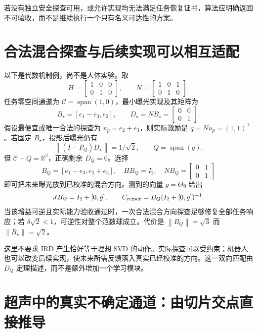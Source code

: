 \documentclass[11pt,a4paper]{article}
\numberwithin{equation}{section}
\theoremstyle{definition}
\newcommand{\R}{\mathbb R}
\newcommand{\norm}[1]{\left\lVert#1\right\rVert}
\begin{document}
若没有独立安全探查可用，或允许实现均无法满足任务恢复证书，算法应明确返回不可验收，而不是继续执行一个只有名义可达性的方案。

\section{合法混合探查与后续实现可以相互适配}
以下是代数机制例，尚不是人体实验。取
\begin{equation}
 H=\begin{bmatrix}1&0&0\\0&1&0\end{bmatrix},\qquad
 N=\begin{bmatrix}1&0&1\\0&1&0\end{bmatrix}.
\end{equation}
任务零空间通道为 $\mathcal C=\operatorname{span}(1,0)$，最小曝光实现及其矩阵为
\begin{equation}
 B_\star=[e_1-e_3,e_2],\qquad
 D_\star=NB_\star=\begin{bmatrix}0&0\\0&1\end{bmatrix}.
\end{equation}
假设最便宜或唯一合法的探查为 $u_p=e_2+e_3$，则实际激励是 $q=Nu_p=(1,1)^\top$。若固定 $B_\star$，投影后曝光仍有
\begin{equation}
 \norm{(I-P_Q)D_\star}=1/\sqrt2,
 \qquad Q=\operatorname{span}(q).
\end{equation}
但 $\mathcal C+Q=\R^2$，正确剩余 $D_Q=0$。选择
\begin{equation}
 B_Q=[e_1-e_3,e_2+e_3],\quad
 HB_Q=I_2,\quad NB_Q=\begin{bmatrix}0&1\\0&1\end{bmatrix}
\end{equation}
即可把未来曝光放到已校准的混合方向。测到的向量 $g=\Theta q$ 给出
\begin{equation}
 JB_Q=I_2+[0,g],\qquad
 C_{\rm repair}=B_Q(I_2+[0,g])^{-1}.
\end{equation}
当该增益可逆且实际能力验收通过时，一次合法混合方向探查足够修复全部任务响应；若 $\delta\sqrt2<1$，可逆性对整个范数球成立。代价是 $\norm{B_Q}=\sqrt3$ 而 $\norm{B_\star}=\sqrt2$。

这里不要求 IRD 产生恰好等于理想 SVD 的动作。实际探查可以受约束；机器人也可以改变后续实现，使未来所需反馈落入真实已经校准的方向。这一双向匹配由 $D_Q$ 定理描述，而不是额外增加一个学习模块。

\section{超声中的真实不确定通道：由切片交点直接推导}
\end{document}
